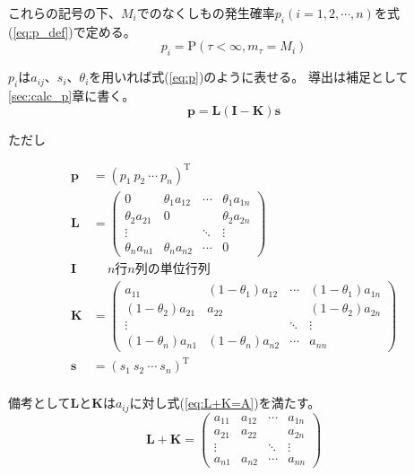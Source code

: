 \documentclass{jarticle}
\begin{document}
これらの記号の下、$M_i$でのなくしもの発生確率$p_i(i=1,2,\cdots,n)$を式(\ref{eq:p_def})で定める。
\begin{equation}
    \label{eq:p_def}
    p_i =\mathrm{P}(\tau < \infty , m_\tau = M_i)
\end{equation}

$p_i$は$a_{i j}$、$s_i$、$\theta_i$を用いれば式(\ref{eq:p})のように表せる。
導出は補足として\ref{sec:calc_p}章に書く。
\begin{equation}
    \label{eq:p}
    \bm{p} =\bm{L}(\bm{I} - \bm{K})\bm{s}
\end{equation}
\begin{center}
    ただし
\end{center}
\begin{align*}
    \bm{p} &= (p_1\ p_2\ \cdots\ p_n)^\mathrm{T} \\
    \bm{L} &= \begin{pmatrix}
        0                & \theta_1 a_{1 2} & \cdots & \theta_1 a_{1 n} \\
        \theta_2 a_{2 1} & 0                &        & \theta_2 a_{2 n} \\
        \vdots           &                  & \ddots & \vdots           \\
        \theta_n a_{n 1} & \theta_n a_{n 2} & \cdots & 0
    \end{pmatrix} \\
    \bm{I} & \quad \ \text{$n$行$n$列の単位行列} \\
    \bm{K} &= \begin{pmatrix}
                       a_{1 1} & (1 - \theta_1) a_{1 2} & \cdots & (1 - \theta_1) a_{1 n} \\
        (1 - \theta_2) a_{2 1} &                a_{2 2} &        & (1 - \theta_2) a_{2 n} \\
        \vdots                 &                        & \ddots & \vdots                 \\
        (1 - \theta_n) a_{n 1} & (1 - \theta_n) a_{n 2} & \cdots &                a_{n n}
    \end{pmatrix} \\
    \bm{s} &= (s_1\ s_2\ \cdots\ s_n)^\mathrm{T} \\
\end{align*}

備考として$\bm{L}$と$\bm{K}$は$a_{i j}$に対し式(\ref{eq:L+K=A})を満たす。
\begin{equation}
    \label{eq:L+K=A}
    \bm{L} + \bm{K} = \begin{pmatrix}
        a_{1 1} & a_{1 2} & \cdots & a_{1 n} \\
        a_{2 1} & a_{2 2} &        & a_{2 n} \\
        \vdots  &         & \ddots & \vdots  \\
        a_{n 1} & a_{n 2} & \cdots & a_{n n}
    \end{pmatrix}
\end{equation}
\end{document}
